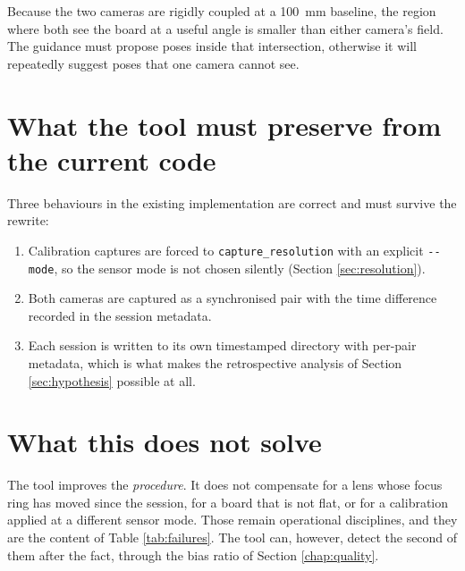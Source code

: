 Because the two cameras are rigidly coupled at a 100~mm baseline, the region where both see the board at a useful angle is smaller than either camera's field. The guidance must propose poses inside that intersection, otherwise it will repeatedly suggest poses that one camera cannot see.

\section{What the tool must preserve from the current code}

Three behaviours in the existing implementation are correct and must survive the rewrite:

\begin{enumerate}
    \item Calibration captures are forced to \texttt{capture\_resolution} with an explicit \texttt{-{}-mode}, so the sensor mode is not chosen silently (Section \ref{sec:resolution}).
    \item Both cameras are captured as a synchronised pair with the time difference recorded in the session metadata.
    \item Each session is written to its own timestamped directory with per-pair metadata, which is what makes the retrospective analysis of Section \ref{sec:hypothesis} possible at all.
\end{enumerate}

\section{What this does not solve}

The tool improves the \emph{procedure}. It does not compensate for a lens whose focus ring has moved since the session, for a board that is not flat, or for a calibration applied at a different sensor mode. Those remain operational disciplines, and they are the content of Table \ref{tab:failures}. The tool can, however, detect the second of them after the fact, through the bias ratio of Section \ref{chap:quality}.
